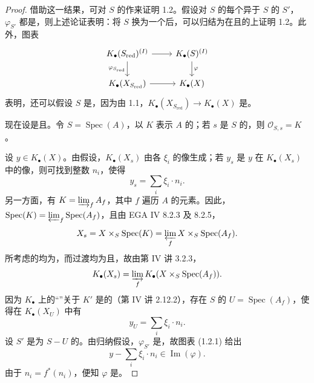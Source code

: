 \begin{proof}
借助这一结果，可对 $S$ 的作来证明 1.2。假设对 $S$ 的每个异于 $S$ 的 $S'$，$\varphi_{S'}$ 都是，则上述论证表明：将 $S$ 换为一个后，可以归结为在且的上证明 1.2。此外，图表
\[
\begin{tikzcd}
K_\bullet(S_{\mathrm{red}})^{(I)}\arrow[r]\arrow[d,"\varphi_{S_{\mathrm{red}}}"']&K_\bullet(S)^{(I)}\arrow[d,"\varphi"]\\
K_\bullet(X_{S_{\mathrm{red}}})\arrow[r]&K_\bullet(X)
\end{tikzcd}
\]
表明，还可以假设 $S$ 是，因为由 1.1，$K_\bullet(X_{S_{\mathrm{red}}})\to K_\bullet(X)$ 是。

现在设是且。令 $S=\operatorname{Spec}(A)$，以 $K$ 表示 $A$ 的；若 $s$ 是 $S$ 的，则 $\mathcal O_{S,s}=K$。

设 $y\in K_\bullet(X)$。由假设，$K_\bullet(X_s)$ 由各 $\xi_i$ 的像生成；若 $y_s$ 是 $y$ 在 $K_\bullet(X_s)$ 中的像，则可找到整数 $n_i$，使得
\[
y_s=\sum_i\xi_i\cdot n_i.
\]
另一方面，有 $K=\varinjlim_f A_f$，其中 $f$ 遍历 $A$ 的元素。因此，$\operatorname{Spec}(K)=\varprojlim_f\operatorname{Spec}(A_f)$，且由 EGA IV 8.2.3 及 8.2.5，
\[
X_s=X\times_S\operatorname{Spec}(K)=\varprojlim_f X\times_S\operatorname{Spec}(A_f).
\]
所考虑的均为，而过渡均为且，故由第 IV 讲 3.2.3，
\[
K_\bullet(X_s)=\varinjlim_f K_\bullet(X\times_S\operatorname{Spec}(A_f)).
\]
因为 $K_\bullet$ 上的“”关于 $K'$ 是的（第 IV 讲 2.12.2），存在 $S$ 的 $U=\operatorname{Spec}(A_f)$，使得在 $K_\bullet(X_U)$ 中有
\[
y_U=\sum_i\xi_i\cdot n_i.
\]
设 $S'$ 是为 $S-U$ 的。由归纳假设，$\varphi_{S'}$ 是，故图表 (1.2.1) 给出
\[
y-\sum_i\xi_i\cdot n_i\in\operatorname{Im}(\varphi).
\]
由于 $n_i=f^*(n_i)$，便知 $\varphi$ 是。
\end{proof}

